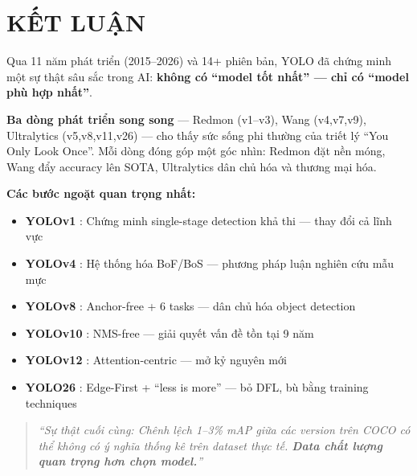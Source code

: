 \chapter{KẾT LUẬN}

Qua 11 năm phát triển (2015--2026) và 14+ phiên bản, YOLO đã chứng minh một sự thật sâu sắc trong AI: \textbf{không có ``model tốt nhất'' --- chỉ có ``model phù hợp nhất''}.

\textbf{Ba dòng phát triển song song} --- Redmon (v1--v3), Wang (v4,v7,v9), Ultralytics (v5,v8,v11,v26) --- cho thấy sức sống phi thường của triết lý ``You Only Look Once''. Mỗi dòng đóng góp một góc nhìn: Redmon đặt nền móng, Wang đẩy accuracy lên SOTA, Ultralytics dân chủ hóa và thương mại hóa.

\textbf{Các bước ngoặt quan trọng nhất:}
\begin{itemize}
    \item \textbf{YOLOv1} \cite{yolov1}: Chứng minh single-stage detection khả thi --- thay đổi cả lĩnh vực
    \item \textbf{YOLOv4} \cite{yolov4}: Hệ thống hóa BoF/BoS --- phương pháp luận nghiên cứu mẫu mực
    \item \textbf{YOLOv8} \cite{yolov8}: Anchor-free + 6 tasks --- dân chủ hóa object detection
    \item \textbf{YOLOv10} \cite{yolov10}: NMS-free --- giải quyết vấn đề tồn tại 9 năm
    \item \textbf{YOLOv12} \cite{yolov12}: Attention-centric --- mở kỷ nguyên mới
    \item \textbf{YOLO26} \cite{yolo26}: Edge-First + ``less is more'' --- bỏ DFL, bù bằng training techniques
\end{itemize}

\begin{quote}
\textit{``Sự thật cuối cùng: Chênh lệch 1--3\% mAP giữa các version trên COCO có thể không có ý nghĩa thống kê trên dataset thực tế. \textbf{Data chất lượng quan trọng hơn chọn model.}''}
\end{quote}

\vspace{0.5cm}

